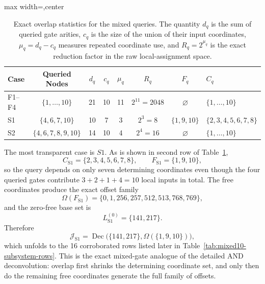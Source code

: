 \documentclass[11pt]{article}
\theoremstyle{definition}
\newcommand{\J}{\mathcal{J}}
\begin{document}
\begin{table}[H]
\centering
\setlength{\tabcolsep}{4pt}
\scriptsize
\begin{adjustbox}{max width=\textwidth,center}
\begin{tabular}{@{}lccccccl@{}}
\toprule
Case & Queried Nodes & \(d_q\) & \(c_q\) & \(\mu_q\) & \(R_q\) & \(F_q\) & \(C_q\)\\
\midrule
F1--F4 & \(\{1,\dots,10\}\) & 21 & 10 & 11 & \(2^{11}=2048\) & \(\varnothing\) & \(\{1,\dots,10\}\) \\
S1 & \(\{4,6,7,10\}\) & 10 & 7 & 3 & \(2^3=8\) & \(\{1,9,10\}\) & \(\{2,3,4,5,6,7,8\}\) \\
S2 & \(\{4,6,7,8,9,10\}\) & 14 & 10 & 4 & \(2^4=16\) & \(\varnothing\) & \(\{1,\dots,10\}\) \\
\bottomrule
\end{tabular}
\end{adjustbox}
\caption{Exact overlap statistics for the mixed queries. The quantity \(d_q\) is the sum of queried gate arities, \(c_q\) is the size of the union of their input coordinates, \(\mu_q=d_q-c_q\) measures repeated coordinate use, and \(R_q=2^{\mu_q}\) is the exact reduction factor in the raw local-assignment space.}
\label{tab:mixed10-overlap-stats}
\end{table}

The most transparent case is \(S1\). As is shown in second row of Table~\ref{tab:mixed10-overlap-stats},
\[
C_{\mathrm{S1}}=\{2,3,4,5,6,7,8\},
\qquad
F_{\mathrm{S1}}=\{1,9,10\},
\]
so the query depends on only seven determining coordinates even though the four queried gates contribute \(3+2+1+4=10\) local inputs in total. The free coordinates produce the exact offset family
\[
\Omega(F_{\mathrm{S1}})=\{0,1,256,257,512,513,768,769\},
\]
and the zero-free base set is
\[
L_{\mathrm{S1}}^{(0)}=\{141,217\}.
\]
Therefore
\[
\J_{\mathrm{S1}}=
\operatorname{Dec}\bigl(\{141,217\},\Omega(\{1,9,10\})\bigr),
\]
which unfolds to the 16 corroborated rows listed later in Table~\ref{tab:mixed10-subsystem-rows}. 
This is the exact mixed-gate analogue of the detailed AND deconvolution: 
overlap first shrinks the determining coordinate set, and only then do 
the remaining free coordinates generate the full family of offsets.
\end{document}
